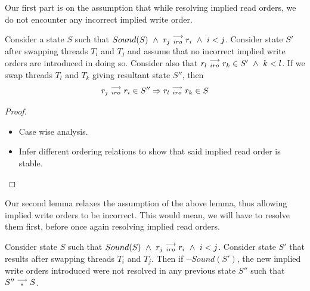         Our first part is on the assumption that while resolving implied read orders, we do not encounter any incorrect implied write order. 
        \begin{lemma}
            \label{iro-stability}
            Consider a state $S$ such that $Sound(S) \ \wedge \ \reln{r_j}{iro}{r_i} \ \wedge \ i < j$.
            Consider state $S'$ after swapping threads $T_i$ and $T_j$ and assume that no incorrect implied write orders are introduced in doing so. 
            Consider also that $r_l\stackrel{\longrightarrow}{_{iro}}r_k \in S' \ \wedge \ k < l$.
            If we swap threads $T_l$ and $T_k$ giving resultant state $S''$, then 
            \begin{align*}
                r_j\stackrel{\longrightarrow}{_{iro}}r_i \in S'' 
                \Rightarrow
                r_l\stackrel{\longrightarrow}{_{iro}}r_k \in S
            \end{align*} 
        \end{lemma}

        \begin{proof}


            \begin{itemize}
                \item Case wise analysis.
                \item Infer different ordering relations to show that said implied read order is stable.
            \end{itemize}

        \end{proof}


        Our second lemma relaxes the assumption of the above lemma, thus allowing implied write orders to be incorrect. 
        This would mean, we will have to resolve them first, before once again resolving implied read orders.
        \begin{lemma}
            \label{iwo-unres-iro}
            Consider state $S$ such that $Sound(S) \ \wedge \ \reln{r_j}{iro}{r_i} \ \wedge \ i < j$.
            Consider state $S'$ that results after swapping threads $T_i$ and $T_j$. 
            Then if $\neg Sound(S')$, the new implied write orders introduced were not resolved in any previous state $S''$ such that $S''\stackrel{\longrightarrow}{_{*}}S$. 
        
        \end{lemma}



